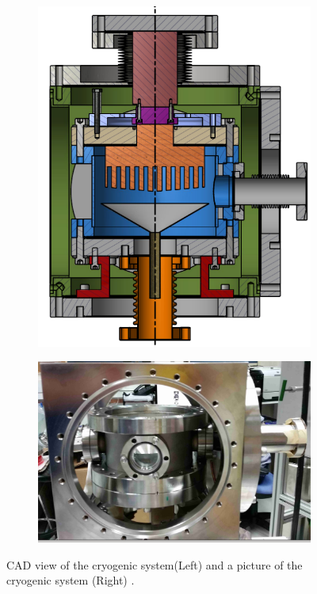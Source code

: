 \begin{figure}
\centering
\begin{subfigure}[c]{0.25\textheight}
\includegraphics[width=\textwidth]{cryoMirror.png}
\end{subfigure}
\begin{subfigure}[c]{0.25\textheight}
\includegraphics[width=\textwidth]{cryoOpenCrop.png}
\end{subfigure}
\caption{ CAD view of the cryogenic system(Left) and a picture of the cryogenic system (Right) . 
\label{fig:cryo}}
\end{figure}

